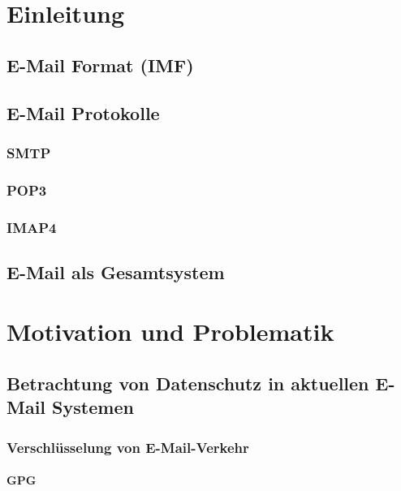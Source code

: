 \documentclass[	%
				a4paper, %
				onecolumn, %
				oneside, %
				titlepage, %
				openany, %
				12pt] %
				{report}
\begin{document}
\thispagestyle{empty}




\setcounter{page}{3}
\tableofcontents

\chapter{Einleitung}
	
	\section{E-Mail Format (IMF)}
		
	\section{E-Mail Protokolle}
		
		\subsection{SMTP}
			
		\subsection{POP3}
			
		\subsection{IMAP4}
			
	\section{E-Mail als Gesamtsystem}
		
	
\chapter{Motivation und Problematik}
	
		\section{Betrachtung von Datenschutz in aktuellen E-Mail Systemen}
			
			\subsection{Verschlüsselung von E-Mail-Verkehr}
				
				\subsubsection{GPG}
					
\end{document}

